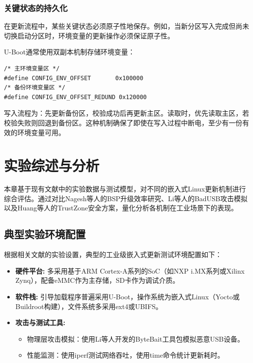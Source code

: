 \documentclass[a4paper,12pt]{article}
\begin{document}
\subsubsection{关键状态的持久化}
在更新流程中，某些关键状态必须原子性地保存。例如，当新分区写入完成但尚未切换启动分区时，环境变量的更新操作必须保证原子性。

U-Boot通常使用双副本机制存储环境变量：
\begin{lstlisting}[caption={U-Boot环境变量双副本机制}]
/* 主环境变量区 */
#define CONFIG_ENV_OFFSET       0x100000
/* 备份环境变量区 */
#define CONFIG_ENV_OFFSET_REDUND 0x120000
\end{lstlisting}

写入流程为：先更新备份区，校验成功后再更新主区。读取时，优先读取主区，若校验失败则回退到备份区。这种机制确保了即使在写入过程中断电，至少有一份有效的环境变量可用。
\newpage
\section{实验综述与分析}

本章基于现有文献中的实验数据与测试模型，对不同的嵌入式Linux更新机制进行综合评估。通过对比Nagesh等人的BSP升级效率研究、Li等人的BadUSB攻击模拟以及Huang等人的TrustZone安全方案，量化分析各机制在工业场景下的表现。

\subsection{典型实验环境配置}
根据相关文献的实验设置，典型的工业级嵌入式更新测试环境配置如下：

\begin{itemize}
   \item \textbf{硬件平台:} 多采用基于ARM Cortex-A系列的SoC（如NXP i.MX系列或Xilinx Zynq），配备eMMC作为主存储，SD卡作为调试介质\cite{Huang2022, Nagesh2019}。
   \item \textbf{软件栈:} 引导加载程序普遍采用U-Boot，操作系统为嵌入式Linux（Yocto或Buildroot构建），文件系统多采用ext4或UBIFS\cite{Cebel2022}。
   \item \textbf{攻击与测试工具:} 
   \begin{itemize}
       \item 物理层攻击模拟：使用Li等人开发的ByteBait工具包模拟恶意USB设备\cite{Li2025}。
       \item 性能监测：使用iperf测试网络吞吐，使用time命令统计更新耗时。
   \end{itemize}
\end{itemize}
\end{document}
